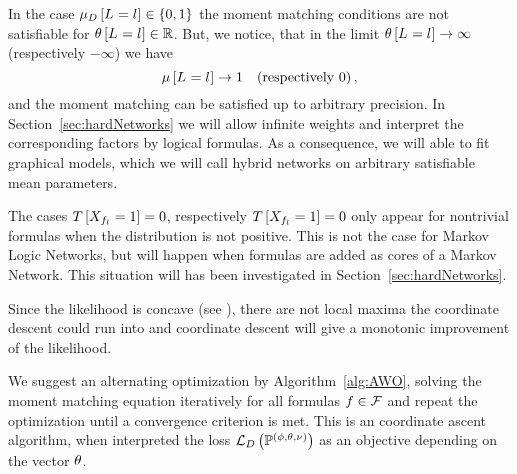 In the case $\mu_{D}\left[L_{}=l_{}\right]\in\{0,1\}$ the moment matching conditions are not satisfiable for $\theta\left[L_{}=l_{}\right]\in\mathbb{R}$.
But, we notice, that in the limit $\theta\left[L_{}=l_{}\right]\rightarrow \infty $ (respectively $-\infty$) we have
	\[ \mu\left[L_{}=l_{}\right] \rightarrow  1 \quad \text{(respectively $0$)}\, ,  \]
and the moment matching can be satisfied up to arbitrary precision.
In Section~\ref{sec:hardNetworks} we will allow infinite weights and interpret the corresponding factors by logical formulas.
As a consequence, we will able to fit graphical models, which we will call hybrid networks on arbitrary satisfiable mean parameters.

%
The cases $T\left[X_{f_{l}}=1\right]=0$, respectively $T\left[X_{f_{l}}=1\right]=0$ only appear for nontrivial formulas when the distribution is not positive. 
This is not the case for Markov Logic Networks, but will happen when formulas are added as cores of a Markov Network.
This situation will has been investigated in Section~\ref{sec:hardNetworks}.


Since the likelihood is concave (see \cite{koller_probabilistic_2009}), there are not local maxima the coordinate descent could run into and coordinate descent will give a monotonic improvement of the likelihood. 

We suggest an alternating optimization by Algorithm~\ref{alg:AWO}, solving the moment matching equation iteratively for all formulas $f\in\mathcal{F}$ and repeat the optimization until a convergence criterion is met.
This is an coordinate ascent algorithm, when interpreted the loss $\mathcal{L}_{D}\left(\mathbb{P}^{(\phi,\theta,\nu)}\right)$ as an objective depending on the vector $\theta$.

